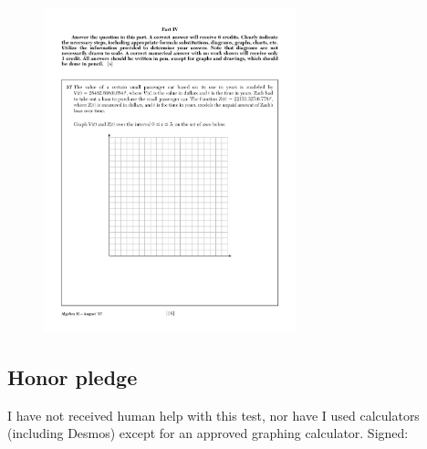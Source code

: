 \documentclass[]{book}
\begin{document}
\begin{enumerate}
\begin{figure}[!ht]
    \flushright
    \includegraphics[width=0.65\textwidth]{1stQ-grid.pdf}
\end{figure}

\subsection*{Honor pledge}
I have not received human help with this test, nor have I used calculators (including Desmos) except for an approved graphing calculator. Signed:

\end{enumerate}
\end{document}
